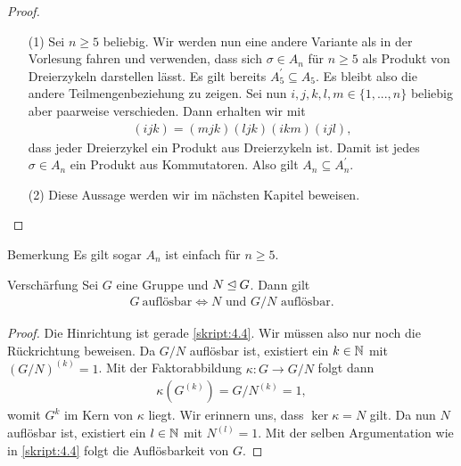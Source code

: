 \begin{proof}\
	\begin{enumerate}
		\item[(1)] 
		Sei $ n \geq 5 $ beliebig. Wir werden nun eine andere Variante als in der Vorlesung fahren und 
		verwenden, dass sich $ \sigma \in A_n$ für $ n \geq 5 $ als Produkt von Dreierzykeln darstellen lässt.
		Es gilt bereits $ A_5^\prime \subseteq A_5 $. Es bleibt also die andere Teilmengenbeziehung zu zeigen.
		Sei nun $ i,j,k,l,m \in \lbrace 1,...,n \rbrace $ beliebig aber paarweise verschieden. 
		Dann erhalten wir mit 
		\begin{align*}
		(ijk) = (mjk)(ljk)(ikm)(ijl),
		\end{align*}
		dass jeder Dreierzykel ein Produkt aus Dreierzykeln ist. Damit ist jedes $ \sigma \in A_n $ ein Produkt aus Kommutatoren. Also gilt $ A_n \subseteq A_n^\prime $.		
		\item[(2)] 
		Diese Aussage werden wir im nächsten Kapitel beweisen.
	\end{enumerate}
\end{proof}

\begin{generic_no_num}{Bemerkung}
	Es gilt sogar $ A_n$ ist einfach für $ n \geq 5 $.
\end{generic_no_num}

\begin{genericthm}{Verschärfung} \label{skript:4.11}
	Sei $ G $ eine Gruppe und $ N \unlhd G $. Dann gilt
	\begin{align*}
	G \ \text{auflösbar} \Leftrightarrow N \text{ und } G/N \text{ auflösbar}.
	\end{align*}
\end{genericthm}

\begin{proof}
	Die Hinrichtung ist gerade \ref{skript:4.4}. Wir müssen also nur noch die Rückrichtung beweisen.
	Da $ G/N $ auflösbar ist, existiert ein $ k \in \mathbb{N} $ mit $ (G/N)^{(k)} = 1 $. Mit der Faktorabbildung
	$ \kappa : G \to G/N $ folgt dann
	\begin{align*}
	\kappa(G^{(k)}) = G/N^{(k)} = 1,
	\end{align*}
	womit $ G^{k} $ im Kern von $ \kappa  $ liegt. Wir erinnern uns, dass $ \ker \kappa = N $ gilt.
	Da nun $ N $ auflösbar ist, existiert ein $ l \in \mathbb{N} $ mit $ N^{(l)} = 1$.
	Mit der selben Argumentation wie in \ref{skript:4.4} folgt die Auflösbarkeit von $ G $.
\end{proof}
